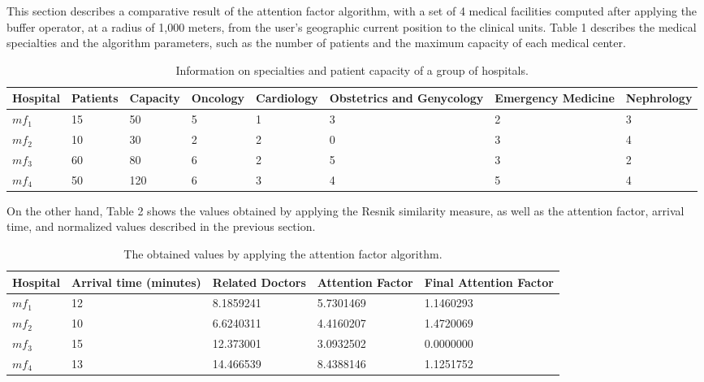 \documentclass[sustainability,article,submit,pdftex,moreauthors]{Definitions/mdpi}
\begin{document}
This section describes a comparative result of the attention factor algorithm, with a set of 4 medical facilities computed after applying the buffer operator, at a radius of 1,000 meters, from the user's geographic current position to the clinical units. Table 1 describes the medical specialties and the algorithm parameters, such as the number of patients and the maximum capacity of each medical center.

\begin{table}[H] 
\caption{Information on specialties and patient capacity of a group of hospitals.\label{table_hospital_info}}
\begin{tabularx}{\textwidth}{CCCCCCCC}
\toprule
\textbf{Hospital} & \textbf{Patients} & \textbf{Capacity} & \textbf{Oncology} & \textbf{Cardiology} & \textbf{Obstetrics and Genycology} & \textbf{Emergency Medicine} & \textbf{Nephrology} \\
\midrule
$mf_{1}$ & 15 & 50  & 5 & 1 & 3 & 2 & 3 \\
$mf_{2}$ & 10 & 30  & 2 & 2 & 0 & 3 & 4 \\
$mf_{3}$ & 60 & 80  & 6 & 2 & 5 & 3 & 2 \\
$mf_{4}$ & 50 & 120 & 6 & 3 & 4 & 5 & 4 \\ 
\bottomrule
\end{tabularx}
\end{table}
\unskip

On the other hand, Table 2 shows the values obtained by applying the Resnik similarity measure, as well as the attention factor, arrival time, and normalized values described in the previous section.


\begin{table}[H] 
\caption{The obtained values by applying the attention factor algorithm.\label{table_hospital_info}}
\begin{tabularx}{\textwidth}{CCCCC}
\toprule
\textbf{Hospital} & \textbf{Arrival time (minutes)} & \textbf{Related Doctors} & \textbf{Attention Factor} & \textbf{Final Attention Factor} \\
\midrule
$mf_{1}$ & 12 & 8.1859241 & 5.7301469 & 1.1460293 \\
$mf_{2}$ & 10 & 6.6240311 & 4.4160207 & 1.4720069 \\
$mf_{3}$ & 15 & 12.373001 & 3.0932502 & 0.0000000 \\
$mf_{4}$ & 13 & 14.466539 & 8.4388146 & 1.1251752 \\
\bottomrule
\end{tabularx}
\end{table}
\unskip
\end{document}
